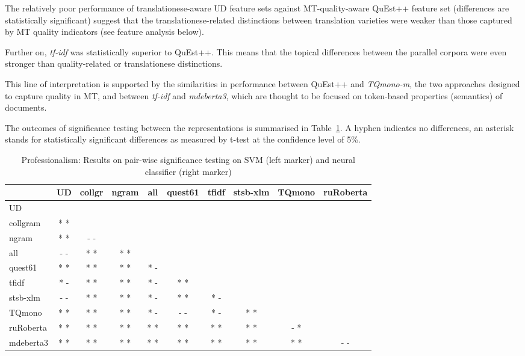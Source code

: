 The relatively poor performance of translationese-aware UD feature sets against MT-quality-aware QuEst++ feature set (differences are statistically significant) suggest that the translationese-related distinctions between translation varieties were weaker than those captured by MT quality indicators (see feature analysis below).

Further on, \textit{tf-idf} was statistically superior to QuEst++. This means that the topical differences between the parallel corpora were even stronger than quality-related or translationese distinctions.

This line of interpretation is supported by the similarities in performance between QuEst++ and \textit{TQmono-m}, the two approaches designed to capture quality in MT, and between \textit{tf-idf} and \textit{mdeberta3}, which are thought to be focused on token-based properties (semantics) of documents. 

The outcomes of significance testing between the representations is summarised in Table~\ref{tab:sign_tests_vars}. A hyphen indicates no differences, an asterisk stands for statistically significant differences as measured by t-test at the confidence level of 5\%.

\begin{table}[H]
	\centering
	\begin{tabular}{l|ccccccccc}
		\toprule
                		& UD  & collgr & ngram & all & quest61 & tfidf & stsb-xlm & TQmono & ruRoberta \\
                \midrule
		UD              &     &          &       &     &    &       &              &          & \\
		collgram        & * * &          &       &     &    &       &              &         & \\
		ngram           & * * & - -      &       &     &    &       &              &          & \\
		all             & - - & * *      & * *   &     &    &       &              &         & \\
		quest61         & * * & * *      & * *   & * - &    &       &              &          & \\
		tfidf           & * - & * *      & * *   & * - & * * &       &              &       & \\
		stsb-xlm        & - - & * *      & * *   & * - & * * & * -   &              &          & \\
		TQmono          & * * & * *      & * *   & * - & - - & * -   & * *          &         & \\
		ruRoberta       & * * & * *      & * *   & * * & * * & * *   & * *          & - *      & \\
		mdeberta3       & * * & * *      & * *   & * * & * * & * *   & * *          & * *  & - - \\
		\bottomrule
	\end{tabular}
	\caption{\label{tab:sign_tests_vars}Professionalism: Results on pair-wise significance testing on SVM (left marker) and neural classifier (right marker)}
\end{table}

